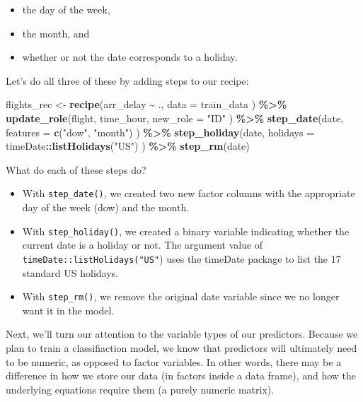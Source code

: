 \documentclass[
]{book}
\newenvironment{Shaded}{\begin{snugshade}}{\end{snugshade}}
\newcommand{\DataTypeTok}[1]{\textcolor[rgb]{0.13,0.29,0.53}{#1}}
\newcommand{\KeywordTok}[1]{\textcolor[rgb]{0.13,0.29,0.53}{\textbf{#1}}}
\newcommand{\NormalTok}[1]{#1}
\newcommand{\OperatorTok}[1]{\textcolor[rgb]{0.81,0.36,0.00}{\textbf{#1}}}
\newcommand{\StringTok}[1]{\textcolor[rgb]{0.31,0.60,0.02}{#1}}
\providecommand{\tightlist}{%
  \setlength{\itemsep}{0pt}\setlength{\parskip}{0pt}}
\begin{document}
\begin{itemize}
\tightlist
\item
  the day of the week,
\item
  the month, and
\item
  whether or not the date corresponds to a holiday.
\end{itemize}

Let's do all three of these by adding steps to our recipe:

\begin{Shaded}
\begin{Highlighting}[]
\NormalTok{flights\_rec \textless{}{-}}
\StringTok{  }\KeywordTok{recipe}\NormalTok{(arr\_delay }\OperatorTok{\textasciitilde{}}\StringTok{ }\NormalTok{.,}
    \DataTypeTok{data =}\NormalTok{ train\_data}
\NormalTok{  ) }\OperatorTok{\%\textgreater{}\%}
\StringTok{  }\KeywordTok{update\_role}\NormalTok{(flight,}
\NormalTok{    time\_hour,}
    \DataTypeTok{new\_role =} \StringTok{"ID"}
\NormalTok{  ) }\OperatorTok{\%\textgreater{}\%}
\StringTok{  }\KeywordTok{step\_date}\NormalTok{(date,}
    \DataTypeTok{features =} \KeywordTok{c}\NormalTok{(}\StringTok{"dow"}\NormalTok{, }\StringTok{"month"}\NormalTok{)}
\NormalTok{  ) }\OperatorTok{\%\textgreater{}\%}
\StringTok{  }\KeywordTok{step\_holiday}\NormalTok{(date,}
    \DataTypeTok{holidays =}\NormalTok{ timeDate}\OperatorTok{::}\KeywordTok{listHolidays}\NormalTok{(}\StringTok{"US"}\NormalTok{)}
\NormalTok{  ) }\OperatorTok{\%\textgreater{}\%}
\StringTok{  }\KeywordTok{step\_rm}\NormalTok{(date)}
\end{Highlighting}
\end{Shaded}

What do each of these steps do?

\begin{itemize}
\item
  With \texttt{step\_date()}, we created two new factor columns with the appropriate day of the week (dow) and the month.
\item
  With \texttt{step\_holiday()}, we created a binary variable indicating whether the current date is a holiday or not. The argument value of \texttt{timeDate::listHolidays("US"}) uses the timeDate package to list the 17 standard US holidays.
\item
  With \texttt{step\_rm()}, we remove the original date variable since we no longer want it in the model.
\end{itemize}

Next, we'll turn our attention to the variable types of our predictors. Because we plan to train a classifiaction model, we know that predictors will ultimately need to be numeric, as opposed to factor variables. In other words, there may be a difference in how we store our data (in factors inside a data frame), and how the underlying equations require them (a purely numeric matrix).
\end{document}
